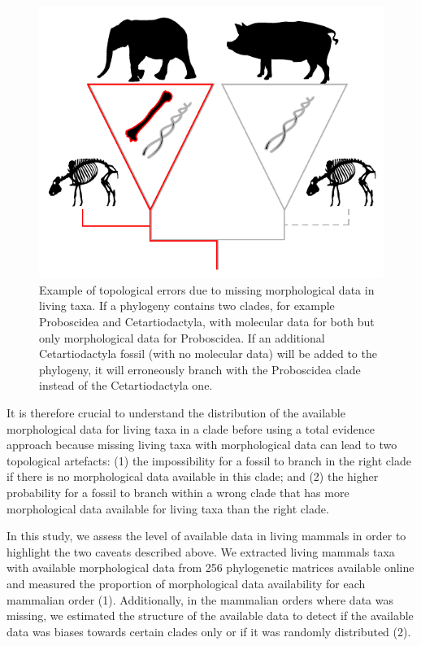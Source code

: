 \documentclass[12pt,letterpaper]{article}
\begin{document}
\begin{figure}[!htbp]
\centering
    \includegraphics[width=1\textwidth]{MissingDataFigure.pdf}
\caption{Example of topological errors due to missing morphological data in living taxa. If a phylogeny contains two clades, for example Proboscidea and Cetartiodactyla, with molecular data for both but only morphological data for Proboscidea. If an additional Cetartiodactyla fossil (with no molecular data) will be added to the phylogeny, it will erroneously branch with the Proboscidea clade instead of the Cetartiodactyla one.}
\label{Figure_missing_data_problem}
\end{figure}

It is therefore crucial to understand the distribution of the available morphological data for living taxa in a clade before using a total evidence approach because missing living taxa with morphological data can lead to two topological artefacts: (1) the impossibility for a fossil to branch in the right clade if there is no morphological data available in this clade; and (2) the higher probability for a fossil to branch within a wrong clade that has more morphological data available for living taxa than the right clade.

In this study, we assess the level of available data in living mammals in order to highlight the two caveats described above.
We extracted living mammals taxa with available morphological data from 256 phylogenetic matrices available online and measured the proportion of morphological data availability for each mammalian order (1). Additionally, in the mammalian orders where data was missing, we estimated the structure of the available data to detect if the available data was biases towards certain clades only or if it was randomly distributed (2).
\end{document}
